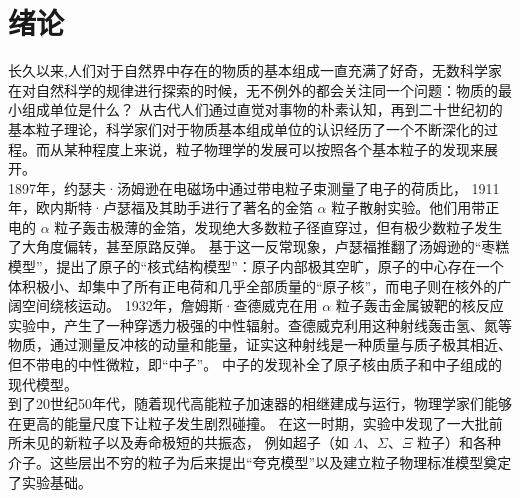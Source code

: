 \chapter{绪论}
\label{chap01}

长久以来,人们对于自然界中存在的物质的基本组成一直充满了好奇，无数科学家在对自然科学的规律进行探索的时候，无不例外的都会关注同一个问题：物质的最小组成单位是什么？
从古代人们通过直觉对事物的朴素认知，再到二十世纪初的基本粒子理论，科学家们对于物质基本组成单位的认识经历了一个不断深化的过程。而从某种程度上来说，粒子物理学的发展可以按照各个基本粒子的发现来展开。\\

1897年，约瑟夫·汤姆逊在电磁场中通过带电粒子束测量了电子的荷质比，
1911年，欧内斯特·卢瑟福及其助手进行了著名的金箔 $\alpha$ 粒子散射实验。他们用带正电的 $\alpha$ 粒子轰击极薄的金箔，发现绝大多数粒子径直穿过，但有极少数粒子发生了大角度偏转，甚至原路反弹。
基于这一反常现象，卢瑟福推翻了汤姆逊的“枣糕模型”，提出了原子的“核式结构模型”：原子内部极其空旷，原子的中心存在一个体积极小、却集中了所有正电荷和几乎全部质量的“原子核”，而电子则在核外的广阔空间绕核运动。
1932年，詹姆斯·查德威克在用 $\alpha$ 粒子轰击金属铍靶的核反应实验中，产生了一种穿透力极强的中性辐射。查德威克利用这种射线轰击氢、氮等物质，通过测量反冲核的动量和能量，证实这种射线是一种质量与质子极其相近、但不带电的中性微粒，即“中子”。
中子的发现补全了原子核由质子和中子组成的现代模型。\\

到了20世纪50年代，随着现代高能粒子加速器的相继建成与运行，物理学家们能够在更高的能量尺度下让粒子发生剧烈碰撞。
在这一时期，实验中发现了一大批前所未见的新粒子以及寿命极短的共振态，
例如超子（如 $\Lambda$、$\Sigma$、$\Xi$ 粒子）和各种介子。这些层出不穷的粒子为后来提出“夸克模型”以及建立粒子物理标准模型奠定了实验基础。

\begin{table}[htbp]
\centering
\small
\setlength{\tabcolsep}{7pt}
\renewcommand{\arraystretch}{1.15}
\caption{标准模型基本粒子内容概览（按代与相互作用分类）。}
\label{tab:SM_overview_noRemark}

\end{table}

